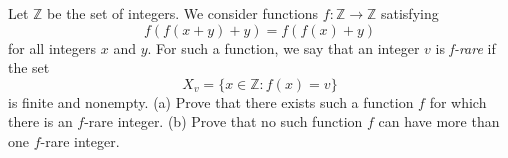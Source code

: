 Let $\mathbb Z$ be the set of integers. We consider functions $f :\mathbb Z\to\mathbb Z$ satisfying
\[f\left(f(x+y)+y\right)=f\left(f(x)+y\right)\]for all integers $x$ and $y$. For such a function, we say that an integer $v$ is \textit{f-rare} if the set
\[X_v=\{x\in\mathbb Z:f(x)=v\}\]is finite and nonempty.
(a) Prove that there exists such a function $f$ for which there is an $f$-rare integer.
(b) Prove that no such function $f$ can have more than one $f$-rare integer.
